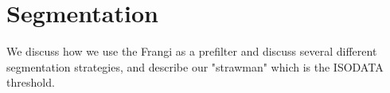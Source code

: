 \chapter{Segmentation}

We discuss how we use the Frangi as a prefilter and discuss several different segmentation strategies, and describe our "strawman" which is the ISODATA threshold.